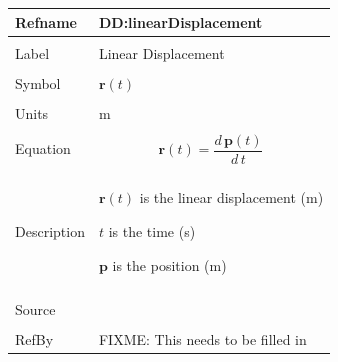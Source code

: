 \documentclass[12pt]{article}
\begin{document}
\noindent \begin{minipage}{\textwidth}
\begin{tabular}{p{} p{}}
\toprule \textbf{Refname} & \textbf{DD:linearDisplacement}
\label{DD:linearDisplacement}
\\ \midrule \\
Label & Linear Displacement
\\ \midrule \\
Symbol & $\mathbf{r}(t)$
\\ \midrule \\
Units & m
\\ \midrule \\
Equation & \begin{dmath}
           \mathbf{r}(t)=\frac{d\,\mathbf{p}\left(t\right)}{d\,t}
           \end{dmath}
\\ \midrule \\
Description & \begin{symbDescription}
              \item{$\mathbf{r}(t)$ is the linear displacement (m)}
              \item{$t$ is the time (s)}
              \item{$\mathbf{p}$ is the position (m)}
              \end{symbDescription}
\\ \midrule \\
Source & 
\\ \midrule \\
RefBy & FIXME: This needs to be filled in
\\ \bottomrule \end{tabular}
\end{minipage}\\
~\newline
\end{document}
